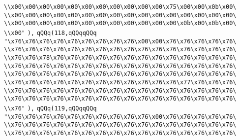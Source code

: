 \verb|\\x00\x00\x00\x00\x00\x00\x00\x00\x00\x00\x00\x75\x00\x00\x0b\x00\|\newline
\verb|\\x00\x00\x00\x00\x00\x00\x00\x00\x00\x00\x00\x00\x00\x00\x00\x00\|\newline
\verb|\\x00\x00\x00\x00\x00\x00\x00\x00\x00\x00\x00\x00\x0b\x00\x0b\x00\|\newline
\verb|\\x00"|\newline
\verb|),|\newline
\verb|qQQq(118,qQQqqQQq|\newline
\verb|"\x76\x76\x76\x76\x76\x76\x76\x76\x76\x00\x00\x76\x76\x76\x76\x76\|\newline
\verb|\\x76\x76\x76\x76\x76\x76\x76\x76\x76\x76\x76\x76\x76\x76\x76\x76\|\newline
\verb|\\x76\x76\x78\x76\x76\x76\x76\x76\x76\x76\x76\x76\x76\x76\x76\x76\|\newline
\verb|\\x76\x76\x76\x76\x76\x76\x76\x76\x76\x76\x76\x76\x76\x76\x76\x76\|\newline
\verb|\\x76\x76\x76\x76\x76\x76\x76\x76\x76\x76\x76\x76\x76\x76\x76\x76\|\newline
\verb|\\x76\x76\x76\x76\x76\x76\x76\x76\x76\x76\x76\x76\x77\x76\x76\x76\|\newline
\verb|\\x76\x76\x76\x76\x76\x76\x76\x76\x76\x76\x76\x76\x76\x76\x76\x76\|\newline
\verb|\\x76\x76\x76\x76\x76\x76\x76\x76\x76\x76\x76\x76\x76\x76\x76\x76\|\newline
\verb|\\x76"|\newline
\verb|),|\newline
\verb|qQQq(119,qQQqqQQq|\newline
\verb|"\x76\x76\x76\x76\x76\x76\x76\x76\x76\x76\x00\x76\x76\x76\x76\x76\|\newline
\verb|\\x76\x76\x76\x76\x76\x76\x76\x76\x76\x76\x76\x76\x76\x76\x76\x76\|\newline
\verb|\\x76\x76\x76\x76\x76\x76\x76\x76\x76\x76\x76\x76\x76\x76\x76\x76\|\newline
